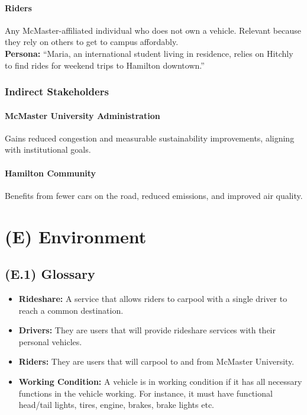 \documentclass[12pt,letterpaper]{article}
\begin{document}
\paragraph{Riders}
Any McMaster-affiliated individual who does not own a vehicle. 
Relevant because they rely on others to get to campus affordably.\\
\textbf{Persona:} ``Maria, an international student living in residence, relies on Hitchly to find rides for weekend trips to Hamilton downtown.''

\subsubsection*{Indirect Stakeholders}

\paragraph{McMaster University Administration}
Gains reduced congestion and measurable sustainability improvements, aligning with institutional goals.

\paragraph{Hamilton Community}
Benefits from fewer cars on the road, reduced emissions, and improved air quality.

\newpage

\section{(E) Environment}

\subsection{(E.1) Glossary}
\begin{itemize}
\item \textbf{Rideshare:} A service that allows riders to carpool with a single driver to reach a common destination.
\item \textbf{Drivers:} They are users that will provide rideshare services with their personal vehicles.  
\item \textbf{Riders:} They are users that will carpool to and from McMaster University.
\item \textbf{Working Condition:} A vehicle is in working condition if it has all necessary functions in the vehicle working. For instance, it must have functional head/tail lights, tires, engine, brakes, brake lights etc.
\end{itemize}
\end{document}
